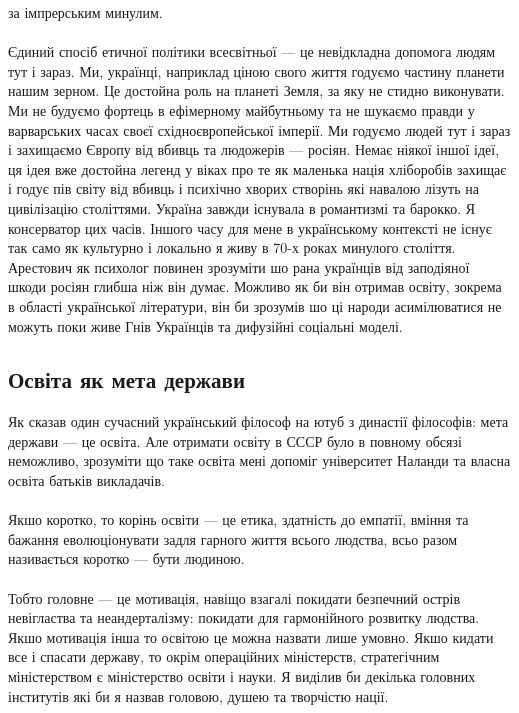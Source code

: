 за імпрерським минулим.
\\
\\
Єдиний спосіб етичної політики всесвітньої — це невідкладна допомога людям тут і
зараз. Ми, українці, наприклад ціною свого життя годуємо частину планети нашим
зерном. Це достойна роль на планеті Земля, за яку не стидно виконувати. Ми не
будуємо фортець в ефімерному майбутньому та не шукаємо правди у варварських
часах своєї східноєвропейської імперії. Ми годуємо людей тут і зараз і захищаємо
Європу від вбивць та людожерів — росіян. Немає ніякої іншої ідеї, ця ідея вже
достойна легенд у віках про те як маленька нація хліборобів захищає і годує пів
світу від вбивць і психічно хворих створінь які навалою лізуть на цивілізацію
століттями. Україна завжди існувала в романтизмі та барокко. Я консерватор цих
часів. Іншого часу для мене в українському контексті не існує так само як
культурно і локально я живу в 70-х роках минулого століття. Арестович як психолог
повинен зрозуміти шо рана українців від заподіяної шкоди росіян глибша ніж він думає.
Можливо як би він отримав освіту, зокрема в області української літератури,
він би зрозумів шо ці народи асимілюватися не можуть поки живе Гнів Українців
та дифузійні соціальні моделі.

\subsection{Освіта як мета держави}

Як сказав один сучасний український філософ на ютуб з династії філософів:
мета держави — це освіта. Але отримати освіту в СССР було в повному обсязі
неможливо, зрозуміти що таке освіта мені допоміг університет Наланди та
власна освіта батьків викладачів.
\\
\\
Якшо коротко, то корінь освіти — це етика, здатність до емпатії, вміння та бажання
еволюціонувати задля гарного життя всього людства, всьо разом називається
коротко — бути людиною.
\\
\\
Тобто головне — це мотивація, навіщо взагалі покидати безпечний острів невігластва
та неандерталізму: покидати для гармонійного розвитку людства. Якшо мотивація інша
то освітою це можна назвати лише умовно. Якшо кидати все і спасати державу, то окрім
операційних міністерств, стратегічним міністерством є міністерство освіти і науки.
Я виділив би декілька головних інститутів які би я назвав головою, душею та творчістю нації.

